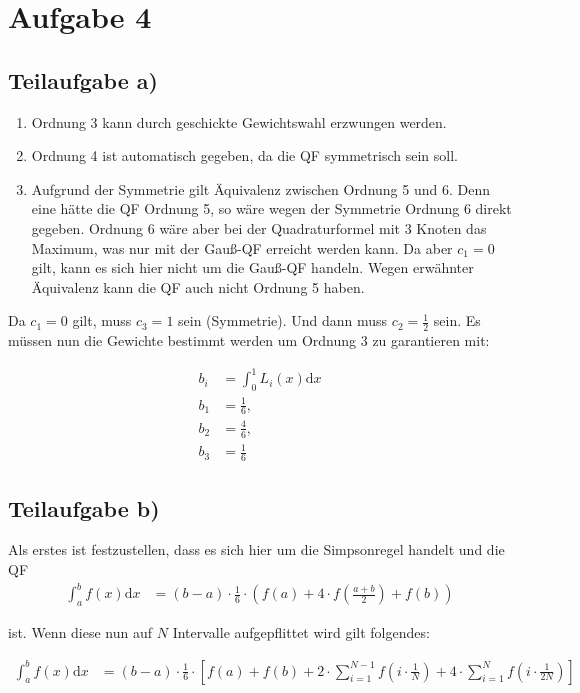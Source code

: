 \section*{Aufgabe 4}
\subsection*{Teilaufgabe a)}
\begin{enumerate}
    \item Ordnung 3 kann durch geschickte Gewichtswahl erzwungen werden.
    \item Ordnung 4 ist automatisch gegeben, da die QF symmetrisch sein soll.
    \item Aufgrund der Symmetrie gilt Äquivalenz zwischen Ordnung 5 und 6.
          Denn eine hätte die QF Ordnung 5, so wäre wegen der
          Symmetrie Ordnung 6 direkt gegeben. Ordnung 6 wäre aber
          bei der Quadraturformel mit 3 Knoten das Maximum, was nur
          mit der Gauß-QF erreicht werden kann. Da aber $c_1 = 0$ gilt,
          kann es sich hier nicht um die Gauß-QF handeln. Wegen
          erwähnter Äquivalenz kann die QF auch nicht Ordnung 5 haben.
\end{enumerate}

Da $c_1 = 0$ gilt, muss $c_3 = 1$ sein (Symmetrie). Und dann muss $c_2 = \frac{1}{2}$
sein. Es müssen nun die Gewichte bestimmt werden um Ordnung 3 zu
garantieren mit:

\begin{align}
    b_i &= \int_0^1 L_i(x) \mathrm{d}x\\
    b_1 &= \frac{1}{6},\\
    b_2 &= \frac{4}{6},\\
    b_3 &= \frac{1}{6}
\end{align}

\subsection*{Teilaufgabe b)}
Als erstes ist festzustellen, dass es sich hier um die Simpsonregel handelt und die QF
\begin{align}
    \int_a^b f(x) \mathrm{d}x &= (b-a) \cdot \frac{1}{6} \cdot \left ( f(a) + 4 \cdot f(\frac{a+b}{2}) + f(b) \right )
\end{align}

ist. Wenn diese nun auf $N$ Intervalle aufgepflittet wird gilt folgendes:

\begin{align}
    \int_a^b f(x) \mathrm{d}x &= (b-a) \cdot \frac{1}{6} \cdot \left [ f(a) + f(b) + 2 \cdot \sum_{i=1}^{N-1} f(i \cdot \frac{1}{N}) + 4 \cdot \sum_{i=1}^N f(i \cdot \frac{1}{2N})\right ]
\end{align}

